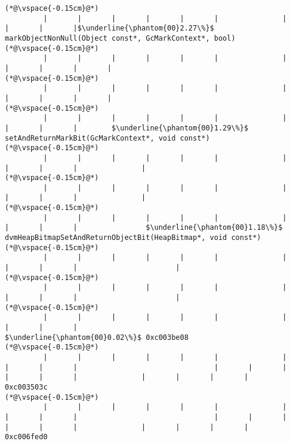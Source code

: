 \begin{lstlisting}[caption=NewDirectByteBuffer, label=profile:C2JNewDirectBuffer-512, numberbychapter=true, frame=lines, float, floatplacement=t]
(*@\vspace{-0.15cm}@*)
         |       |       |       |       |       |               |       |       |       |$\underline{\phantom{00}2.27\%}$ markObjectNonNull(Object const*, GcMarkContext*, bool)
(*@\vspace{-0.15cm}@*)
         |       |       |       |       |       |               |       |       |       |       |
(*@\vspace{-0.15cm}@*)
         |       |       |       |       |       |               |       |       |       |       |
(*@\vspace{-0.15cm}@*)
         |       |       |       |       |       |               |       |       |       |        $\underline{\phantom{00}1.29\%}$ setAndReturnMarkBit(GcMarkContext*, void const*)
(*@\vspace{-0.15cm}@*)
         |       |       |       |       |       |               |       |       |       |               |
(*@\vspace{-0.15cm}@*)
         |       |       |       |       |       |               |       |       |       |               |
(*@\vspace{-0.15cm}@*)
         |       |       |       |       |       |               |       |       |       |                $\underline{\phantom{00}1.18\%}$ dvmHeapBitmapSetAndReturnObjectBit(HeapBitmap*, void const*)
(*@\vspace{-0.15cm}@*)
         |       |       |       |       |       |               |       |       |       |                       |
(*@\vspace{-0.15cm}@*)
         |       |       |       |       |       |               |       |       |       |                       |
(*@\vspace{-0.15cm}@*)
         |       |       |       |       |       |               |       |       |       |                        $\underline{\phantom{00}0.02\%}$ 0xc003be08
(*@\vspace{-0.15cm}@*)
         |       |       |       |       |       |               |       |       |       |                                |       |       |       |       |       |               |       |       |       |                               0xc003503c
(*@\vspace{-0.15cm}@*)
         |       |       |       |       |       |               |       |       |       |                                |       |       |       |       |       |               |       |       |       |                               0xc006fed0

\end{lstlisting}
